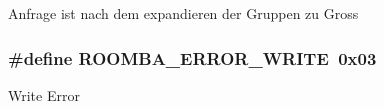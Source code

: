 Anfrage ist nach dem expandieren der Gruppen zu Gross \hypertarget{group__roomba__error_ga05101b46c99b86cf46f59d1238ca7298}{
\subsubsection[{R\-O\-O\-M\-B\-A\-\_\-\-E\-R\-R\-O\-R\-\_\-\-W\-R\-I\-T\-E}]{\setlength{\rightskip}{0pt plus 5cm}\#define R\-O\-O\-M\-B\-A\-\_\-\-E\-R\-R\-O\-R\-\_\-\-W\-R\-I\-T\-E~0x03}}\label{group__roomba__error_ga05101b46c99b86cf46f59d1238ca7298}
Write Error 